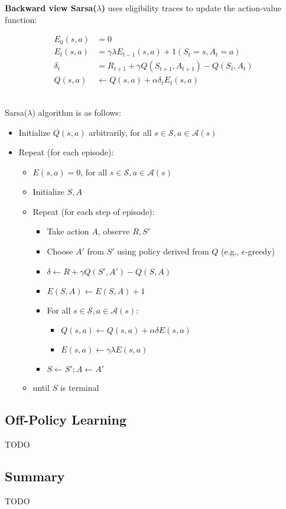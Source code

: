 \noindent \textbf{Backward view Sarsa($\lambda$)} uses eligibility traces to update the
action-value function:

\begin{align*}
    E_0(s, a) & = 0                                                  \\
    E_t(s, a) & = \gamma \lambda E_{t-1}(s, a) + 1(S_t = s, A_t = a) \\
    \delta_t  & = R_{t+1} + \gamma Q(S_{t+1}, A_{t+1}) - Q(S_t, A_t) \\
    Q(s, a)   & \leftarrow Q(s, a) + \alpha \delta_t E_t(s, a)
\end{align*}\

\noindent Sarsa($\lambda$) algorithm is as follows:

\begin{itemize}
    \item Initialize $Q(s, a)$ arbitrarily, for all $s \in \mathcal{S}, a \in
              \mathcal{A}(s)$
    \item Repeat (for each episode):
          \begin{itemize}
              \item $E(s, a) = 0$, for all $s \in \mathcal{S}, a \in \mathcal{A}(s)$
              \item Initialize $S, A$
              \item Repeat (for each step of episode):
                    \begin{itemize}
                        \item Take action $A$, observe $R, S'$
                        \item Choose $A'$ from $S'$ using policy derived from $Q$ (e.g., $\epsilon$-greedy)
                        \item $\delta \leftarrow R + \gamma Q(S', A') - Q(S, A)$
                        \item $E(S, A) \leftarrow E(S, A) + 1$
                        \item For all $s \in \mathcal{S}, a \in \mathcal{A}(s)$:
                              \begin{itemize}
                                  \item $Q(s, a) \leftarrow Q(s, a) + \alpha \delta E(s, a)$
                                  \item $E(s, a) \leftarrow \gamma \lambda E(s, a)$
                              \end{itemize}
                        \item $S \leftarrow S'; A \leftarrow A'$
                    \end{itemize}
              \item until $S$ is terminal
          \end{itemize}
\end{itemize}

\subsection{Off-Policy Learning}

TODO

\subsection{Summary}

TODO
